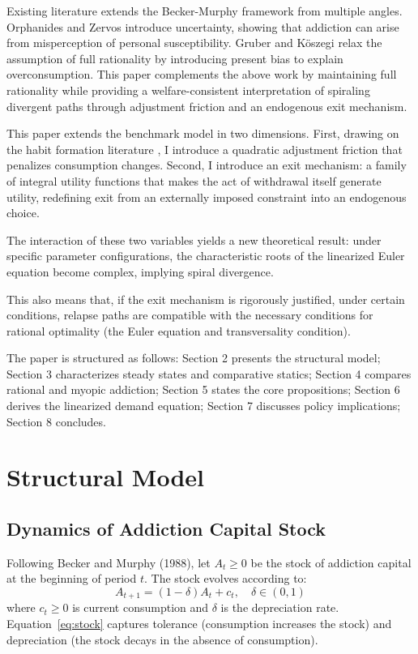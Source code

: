 \documentclass[12pt]{article}
\begin{document}
Existing literature extends the Becker-Murphy framework from multiple angles. Orphanides and Zervos \cite{Orphanides1995}
introduce uncertainty, showing that addiction can arise from misperception of personal susceptibility. Gruber and K\"oszegi \cite{Gruber2001}
relax the assumption of full rationality by introducing present bias to explain overconsumption. This paper complements the above work by maintaining full
rationality while providing a welfare-consistent interpretation of spiraling divergent paths through adjustment friction and an endogenous exit mechanism.

This paper extends the benchmark model in two dimensions. First, drawing on the habit formation literature \cite{Carroll2000,Fuhrer2000},
I introduce a quadratic adjustment friction that penalizes consumption changes. Second, I introduce an exit mechanism: a family of integral utility
functions that makes the act of withdrawal itself generate utility, redefining exit from an externally imposed constraint into an endogenous choice.

The interaction of these two variables yields a new theoretical result: under specific parameter configurations, the characteristic roots of the linearized Euler
equation become complex, implying spiral divergence.

This also means that, if the exit mechanism is rigorously justified, under certain conditions,
relapse paths are compatible with the necessary conditions for rational optimality (the Euler equation and transversality condition).

The paper is structured as follows: Section 2 presents the structural model; Section 3 characterizes steady states and comparative statics; Section 4 compares rational
and myopic addiction; Section 5 states the core propositions; Section 6 derives the linearized demand equation; Section 7 discusses policy implications;
Section 8 concludes.

\section{Structural Model}

\subsection{Dynamics of Addiction Capital Stock}

Following Becker and Murphy (1988), let $A_t \geq 0$ be the stock of addiction capital at the beginning of period $t$. The stock evolves according to:
\begin{equation}\label{eq:stock}
A_{t+1} = (1-\delta)A_t + c_t, \quad \delta \in (0,1)
\end{equation}
where $c_t \geq 0$ is current consumption and $\delta$ is the depreciation rate. Equation~\eqref{eq:stock} captures tolerance
(consumption increases the stock) and depreciation (the stock decays in the absence of consumption).
\end{document}
